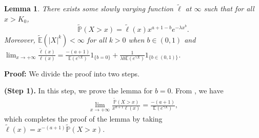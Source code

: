 \documentclass[11pt]{article}
\newtheorem{lemma}[thrm]{Lemma}
\numberwithin{equation}{section}
\begin{document}
\begin{lemma}\label{lem1}
	There exists some slowly varying function $\widetilde{\ell}$ at $\infty$ such that for all $x>K_0$, 
	\[
		\widetilde{\mathbb{P}}(X>x)=	\widetilde{\ell}(x) x^{a+1-b} e^{-\lambda x^b}.
	\]
	Moreover, $\widetilde{\mathbb{E}}(|X|^k)<\infty$ for all $k>0$ when $b\in (0,1)$ and $\lim_{x\to+\infty} \frac{\widetilde{\ell}(x)}{\ell(x)}= \frac{-(a+1)}{\mathbb{E}(e^{\gamma X})}1_{\{b=0\}}+ \frac{1}{\lambda b \mathbb{E}(e^{\gamma X})}1_{\{b\in (0,1)\}}$.
\end{lemma}
\textbf{Proof: } We divide the proof into two steps.

\noindent
{\bf (Step 1).} In this step, we prove the lemma for $b=0$. From \cite[Proposition 1.5.10, p. 27]{BGT1987}, we have
\begin{align} 
	\lim_{x\to+\infty} \frac{\widetilde{\mathbb{P}}(X>x)}{x^{a+1}\ell(x)}= \frac{-(a+1)}{\mathbb{E}(e^{\gamma X})},
\end{align}
which completes the proof of the lemma by taking $\widetilde{\ell}(x) =x^{-(a+1)}\widetilde{\mathbb{P}}(X>x)$.
\end{document}
